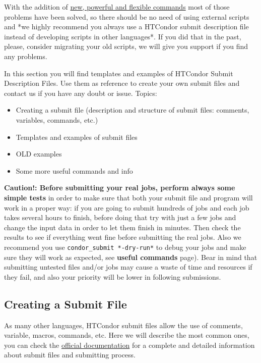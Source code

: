 \documentclass[a4paper,10pt]{article}
\begin{document}
With the addition of \href{http://research.cs.wisc.edu/htcondor/manual/v8.6/2\_5Submitting\_Job.html\#SECTION00352000000000000000}{new, powerful and flexible commands} most of those problems
have been solved, so there should be no need of using external scripts and *we
highly recommend you always use a HTCondor submit description file instead of
developing scripts in other languages*. If you did that in the past, please,
consider migrating your old scripts, we will give you support if you find any
problems.

In this section you will find templates and examples of HTCondor Submit
Description Files. Use them as reference to create your own submit files and
contact us if you have any doubt or issue. Topics:

\begin{itemize}
\item Creating a submit file (description and structure of
submit files: comments, variables, commands, etc.)
\item Templates and examples of submit files
\item OLD examples
\item Some more useful commands and info
\end{itemize}


\begin{mdframed}
\textbf{Caution!: Before submitting your real jobs, perform always some simple tests}
 in order to make sure that both your submit file and program will work in a
 proper way: if you are going to submit hundreds of jobs and each job takes
 several hours to finish, before doing that try with just a few jobs and change
 the input data in order to let them finish in minutes. Then check the results
 to see if everything went fine before submitting the real jobs. Also we
 recommend you use \texttt{condor\_submit *-dry-run*} to debug your jobs and make sure
 they will work as expected, see \textbf{useful commands} page). Bear in mind that
 submitting untested files and/or jobs may cause a waste of time and resources
 if they fail, and also your priority will be lower in following submissions.
\end{mdframed}


\subsection{Creating a Submit File}
\label{sec:org2256cb7}

As many other languages, HTCondor submit files allow the use of comments,
variable, macros, commands, etc. Here we will describe the most common ones, you
can check the \href{https://research.cs.wisc.edu/htcondor/manual}{official documentation} for a complete and detailed
information about submit files and submitting process.
\end{document}
